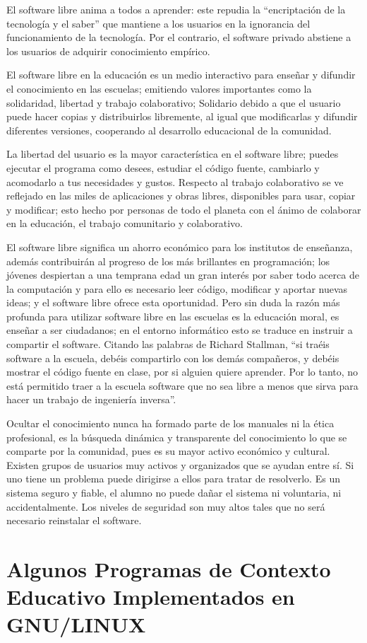 El software libre anima a todos a aprender: este repudia la
“encriptación de la tecnología y el saber” que mantiene a los
usuarios en la ignorancia del funcionamiento de la tecnología.
Por el contrario, el software privado abstiene a los usuarios de
adquirir conocimiento empírico.

El software libre en la educación es un medio interactivo para
enseñar y difundir el conocimiento en las escuelas; emitiendo
valores importantes como la solidaridad, libertad y trabajo
colaborativo; Solidario debido a que el usuario puede hacer
copias y distribuirlos libremente, al igual que modificarlas y
difundir diferentes versiones, cooperando al desarrollo
educacional de la comunidad.

La libertad del usuario es la mayor característica en el software
libre; puedes ejecutar el programa como desees, estudiar el
código fuente, cambiarlo y acomodarlo a tus necesidades y
gustos. Respecto al trabajo colaborativo se ve reflejado en las
miles de aplicaciones y obras libres, disponibles para usar,
copiar y modificar; esto hecho por personas de todo el planeta
con el ánimo de colaborar en la educación, el trabajo
comunitario y colaborativo.

El software libre significa un ahorro económico para los
institutos de enseñanza, además contribuirán al progreso de los
más brillantes en programación; los jóvenes despiertan a una
temprana edad un gran interés por saber todo acerca de la
computación y para ello es necesario leer código, modificar y
aportar nuevas ideas; y el software libre ofrece esta
oportunidad.
Pero sin duda la razón más profunda para utilizar software libre
en las escuelas es la educación moral, es enseñar a ser
ciudadanos; en el entorno informático esto se traduce en
instruir a compartir el software. 
Citando las palabras de Richard Stallman, “si traéis software a la escuela, debéis
compartirlo con los demás compañeros, y debéis mostrar el
código fuente en clase, por si alguien quiere aprender. Por lo
tanto, no está permitido traer a la escuela software que no sea
libre a menos que sirva para hacer un trabajo de ingeniería
inversa”.

Ocultar el conocimiento nunca ha formado parte de los
manuales ni la ética profesional, es la búsqueda dinámica y
transparente del conocimiento lo que se comparte por la
comunidad, pues es su mayor activo económico y cultural.
Existen grupos de usuarios muy activos y organizados que se
ayudan entre sí. Si uno tiene un problema puede dirigirse a ellos
para tratar de resolverlo.
Es un sistema seguro y fiable, el alumno no puede dañar el
sistema ni voluntaria, ni accidentalmente. Los niveles de
seguridad son muy altos tales que no será necesario reinstalar el
software.




\section*{Algunos Programas de Contexto Educativo Implementados en GNU/LINUX}
